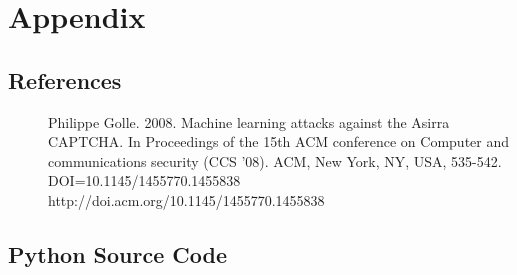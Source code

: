 \documentclass[12pt]{article}
\begin{document}
\section{Appendix}
\subsection{References}
\begin{description}
\item[] Philippe Golle. 2008. Machine learning attacks against the Asirra CAPTCHA. In Proceedings of the 15th ACM conference on Computer and communications security (CCS '08). ACM, New York, NY, USA, 535-542. DOI=10.1145/1455770.1455838 http://doi.acm.org/10.1145/1455770.1455838
\item[] 
\end{description}

\subsection{Python Source Code}
%
 
\end{document}
